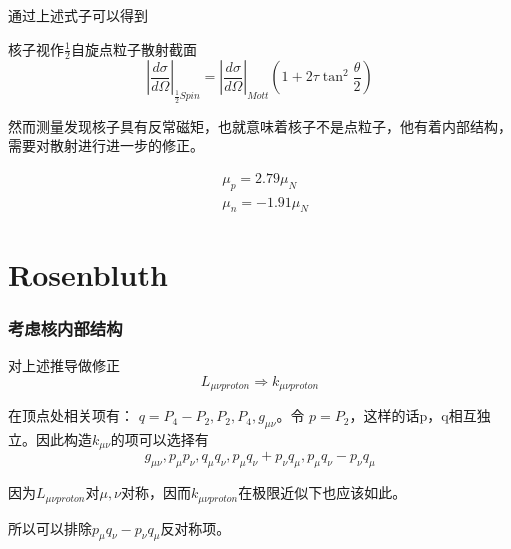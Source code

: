 \documentclass[slidestop, compress, red]{beamer}
\begin{document}
\begin{frame}
通过上述式子可以得到
\begin{block}{核子视作$\frac{1}{2}$自旋点粒子散射截面}
\begin{equation}
	|\frac{d\sigma}{d\Omega}|_{\frac{1}{2}Spin}=|\frac{d\sigma}{d\Omega}|_{Mott}(1+2\tau\tan^2\frac{\theta}{2})
\end{equation}
\end{block}

然而测量发现核子具有反常磁矩，也就意味着核子不是点粒子，他有着内部结构，需要对散射进行进一步的修正。

\begin{equation}
	\begin{split}
	&\mu_p=2.79\mu_N\\
	&\mu_n=-1.91\mu_N
	\end{split}
\end{equation}
\end{frame}

\section{Rosenbluth}
\begin{frame}
\frametitle{考虑核内部结构}
\begin{alertblock}{对上述推导做修正}
$$
L_{\mu\nu proton} \Rightarrow k_{\mu\nu proton}
$$
\end{alertblock}

在顶点处相关项有： $q=P_4-P_2, P_2, P_4, g_{\mu\nu}$。令 $p=P_2$，这样的话p，q相互独立。因此构造$k_{\mu\nu}$的项可以选择有
$$
g_{\mu\nu}, p_\mu p_\nu, q_\mu q_\nu, p_\mu q_\nu+p_\nu q_\mu, p_\mu q_\nu-p_\nu q_\mu
$$

因为$L_{\mu\nu proton}$对$\mu, \nu$对称，因而$k_{\mu\nu proton}$在极限近似下也应该如此。

所以可以排除$p_\mu q_\nu-p_\nu q_\mu$反对称项。


\end{frame}
\end{document}
